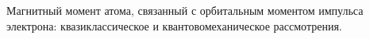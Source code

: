 \documentclass[__main__.tex]{subfiles}
\begin{document}
Магнитный момент атома, связанный с орбитальным моментом импульса электрона: квазиклассическое и квантовомеханическое рассмотрения.\\ 

\end{document}
